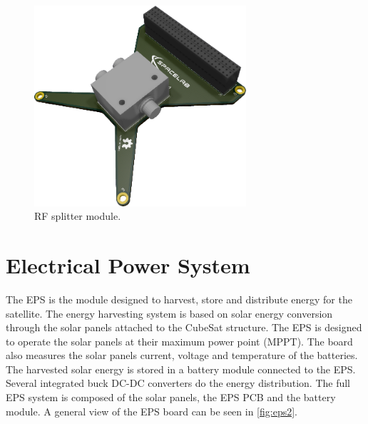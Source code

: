 \begin{figure}[!ht]
    \begin{center}
        \includegraphics[width=0.7\textwidth]{figures/rf-splitter}
        \caption{RF splitter module.}
        \label{fig:rf-splitter-module}
    \end{center}
\end{figure}

\section{Electrical Power System}

The EPS is the module designed to harvest, store and distribute energy for the satellite. The energy harvesting system is based on solar energy conversion through the solar panels attached to the CubeSat structure. The EPS is designed to operate the solar panels at their maximum power point (MPPT). The board also measures the solar panels current, voltage and temperature of the batteries. The harvested solar energy is stored in a battery module connected to the EPS. Several integrated buck DC-DC converters do the energy distribution. The full EPS system is composed of the solar panels, the EPS PCB and the battery module. A general view of the EPS board can be seen in \autoref{fig:eps2}.


